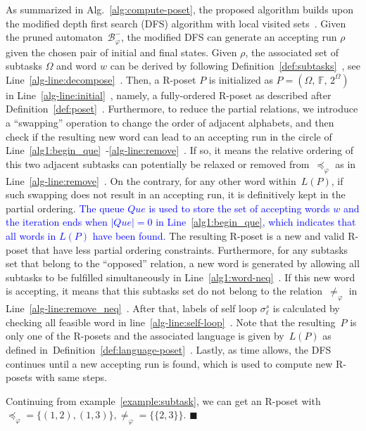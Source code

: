 As summarized in Alg.~\ref{alg:compute-poset},
the proposed algorithm builds upon the modified depth first search (DFS)
algorithm with local visited sets~\citep{sedgewick2001algorithms}.
Given the pruned automaton~$\mathcal{B}_{\varphi}^-$,
the modified DFS can generate an accepting run $\rho$ given the chosen pair of
initial and final states.
Given $\rho$, the associated set of subtasks $\Omega$ and word $w$ can be
derived by following Definition~\ref{def:subtasks}~, see Line~\ref{alg-line:decompose}~.
Then, a R-poset $P$ is initialized as $P=(\Omega,\, \mathbb{F},\, 2^{\Omega})$
in Line~\ref{alg-line:initial}~,
namely, a fully-ordered R-poset as described after Definition~\ref{def:poset}~.
Furthermore, to reduce the partial relations,
we introduce a ``swapping'' operation to change the order of adjacent alphabets,
and then check if the resulting new word can lead to an accepting run
in the circle of Line~\ref{alg1:begin_que}~-\ref{alg-line:remove}~.
If so, it means the relative ordering of this two adjacent subtasks can
potentially be relaxed or removed from~$\preceq_{\varphi}$ as in Line~\ref{alg-line:remove}~.
On the contrary, for any other word within~$L(P)$, if such swapping does not
result in an accepting run, it is definitively kept in the partial ordering.
\textcolor{blue}{The queue $Que$ is used to store the set of accepting words $w$ and the iteration ends when $|Que|=0$ in Line~\ref{alg1:begin_que},
which indicates that all words in $L(P)$ have been found.}
The resulting R-poset is a new and valid R-poset that have less partial
ordering constraints.
Furthermore, for any subtasks set that belong to the ``opposed'' relation,
a new word is generated by allowing all subtasks to be fulfilled simultaneously
in Line~\ref{alg1:word-neq}~.
If this new word is accepting, it means that this subtasks set do not belong to the
relation~$\neq_{\varphi}$ in Line~\ref{alg-line:remove_neq}~. After that, labels of self loop $\sigma^s_\ell$ is calculated
by checking all feasible word in line~\ref{alg-line:self-loop}~.
Note that the resulting~$P$ is only one of the R-posets and the associated language is
given by~$L(P)$ as defined in~Definition~\ref{def:language-poset}~.
Lastly, as time allows, the DFS continues until a new accepting run is found,
which is used to compute new R-posets with same steps.

\begin{example}
	Continuing from example~\ref{example:subtask}, we can get an R-poset with
	$\preceq_\varphi=\{(1,2),(1,3)\},\neq_{\varphi}=\{\{2,3\}\}$.
        \hfill $\blacksquare$
\end{example}

